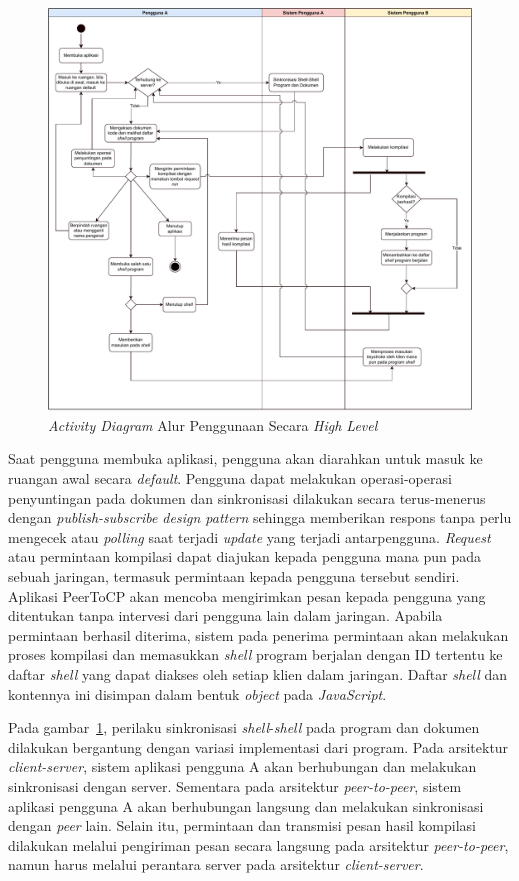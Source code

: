 \begin{figure}
    \centering
    \includegraphics[scale=0.5]{assets/skripsi/Activity_Diagram}
    \caption{\textit{Activity Diagram} Alur Penggunaan Secara \textit{High Level}}
    \label{fig:activity}
\end{figure}

Saat pengguna membuka aplikasi, pengguna akan diarahkan untuk masuk ke ruangan awal secara \textit{default}. Pengguna dapat melakukan operasi-operasi penyuntingan pada dokumen dan sinkronisasi dilakukan secara terus-menerus dengan \textit{publish-subscribe design pattern} sehingga memberikan respons tanpa perlu mengecek atau \textit{polling} saat terjadi \textit{update} yang terjadi antarpengguna. \textit{Request} atau permintaan kompilasi dapat diajukan kepada pengguna mana pun pada sebuah jaringan, termasuk permintaan kepada pengguna tersebut sendiri. Aplikasi PeerToCP akan mencoba mengirimkan pesan kepada pengguna yang ditentukan tanpa intervesi dari pengguna lain dalam jaringan. Apabila permintaan berhasil diterima, sistem pada penerima permintaan akan melakukan proses kompilasi dan memasukkan \textit{shell} program berjalan dengan ID tertentu ke daftar \textit{shell} yang dapat diakses oleh setiap klien dalam jaringan. Daftar \textit{shell} dan kontennya ini disimpan dalam bentuk \textit{object} pada \textit{JavaScript}.

Pada gambar~\ref{fig:activity}, perilaku sinkronisasi \textit{shell}-\textit{shell} pada program dan dokumen dilakukan bergantung dengan variasi implementasi dari program. Pada arsitektur \textit{client-server}, sistem aplikasi pengguna A akan berhubungan dan melakukan sinkronisasi dengan server. Sementara pada arsitektur \textit{peer-to-peer}, sistem aplikasi pengguna A akan berhubungan langsung dan melakukan sinkronisasi dengan \textit{peer} lain. Selain itu, permintaan dan transmisi pesan hasil kompilasi dilakukan melalui pengiriman pesan secara langsung pada arsitektur \textit{peer-to-peer}, namun harus melalui perantara server pada arsitektur \textit{client-server}.

